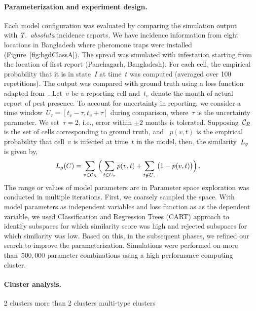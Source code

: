 \documentclass{article}
\newcommand{\tuta}{\emph{T.~absoluta}}
\begin{document}
\paragraph{Parameterization and experiment design.}
Each model configuration was evaluated by comparing the simulation output
with \tuta{} incidence reports. We have incidence information from eight
locations in Bangladesh where pheromone traps were installed
(Figure~\ref{fig:bgdClassA}). The spread was simulated with infestation
starting from the location of first report (Panchagarh, Bangladesh). For
each cell, the empirical probability that it is in state~$I$ at time~$t$
was computed (averaged over 100 repetitions). The output was compared with
ground truth using a loss function adapted
from~\cite{carrasco2010unveiling}. Let~$v$ be a reporting cell and~$t_v$
denote the month of actual report of pest presence. To account for
uncertainty in reporting, we consider a time
window~$U_\tau=[t_v-\tau,t_v+\tau]$ during comparison, where~$\tau$ is the
uncertainty parameter. We set~$\tau=2$, i.e., error within $\pm2$ months is
tolerated. Supposing~$\mathcal{C}_R$ is the set of cells corresponding
to ground truth,  and ~$p(v,t)$ is the empirical probability that cell~$v$
is infected at time~$t$ in the model, then, the similarity~$L_g$ is given
by,
\begin{align}\label{eqn:similarity}
    L_g(C)=\sum_{v\in\mathcal{C}_R} \Big(\sum_{t\in U_\tau}p(v,t)
    + \sum_{t\notin U_\tau}\big(1-p(v,t)\big) \Big)\,.
\end{align}
The range or values of model parameters are in 
\iftoggle{short}{\cite{long}.}{Table~\ref{tab:param}.}
Parameter space exploration was conducted in multiple iterations.  First,
we coarsely sampled the space. With model parameters as independent
variables and loss function as as the dependent variable, we used
Classification and Regression Trees (CART) approach to identify subspaces
for which similarity score was high and rejected subspaces for which
similarity was low. Based on this, in the subsequent phases, we refined our
search to improve the parameterization. Simulations were performed on
more than~$500,000$ parameter combinations using a high performance
computing cluster.

\paragraph{Cluster analysis.}
2 clusters
more than 2 clusters
multi-type clusters
\end{document}
